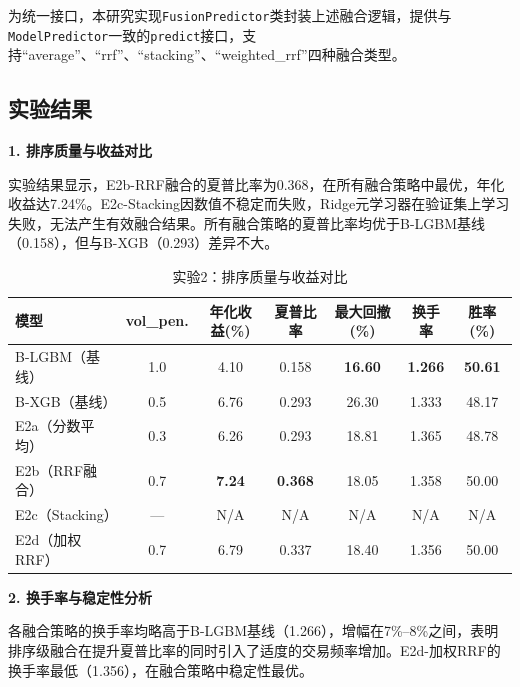 \documentclass[11pt,a4paper]{ctexart}
\newcommand{\best}[1]{\textcolor{bestval}{\textbf{#1}}}
\begin{document}
为统一接口，本研究实现\texttt{FusionPredictor}类封装上述融合逻辑，提供与\texttt{ModelPredictor}一致的\texttt{predict}接口，支持``average''、``rrf''、``stacking''、``weighted\_rrf''四种融合类型。

\subsection{实验结果}


\textbf{1. 排序质量与收益对比}

实验结果显示，E2b-RRF融合的夏普比率为0.368，在所有融合策略中最优，年化收益达7.24\%。E2c-Stacking因数值不稳定而失败，Ridge元学习器在验证集上学习失败，无法产生有效融合结果。所有融合策略的夏普比率均优于B-LGBM基线（0.158），但与B-XGB（0.293）差异不大。

\begin{table}[htbp]
\centering
\caption{实验2：排序质量与收益对比}
\label{tab:exp2-main}
\begin{tabular}{lcccccc}
\toprule
\textbf{模型} & \textbf{vol\_pen.} & \textbf{年化收益(\%)} & \textbf{夏普比率} & \textbf{最大回撤(\%)} & \textbf{换手率} & \textbf{胜率(\%)} \\
\midrule
B-LGBM（基线） & 1.0 & 4.10 & 0.158 & \best{16.60} & \best{1.266} & \best{50.61} \\
B-XGB（基线）  & 0.5 & 6.76 & 0.293 & 26.30 & 1.333 & 48.17 \\
E2a（分数平均） & 0.3 & 6.26 & 0.293 & 18.81 & 1.365 & 48.78 \\
E2b（RRF融合） & 0.7 & \best{7.24} & \best{0.368} & 18.05 & 1.358 & 50.00 \\
E2c（Stacking） & --- & N/A & N/A & N/A & N/A & N/A \\
E2d（加权RRF） & 0.7 & 6.79 & 0.337 & 18.40 & 1.356 & 50.00 \\
\bottomrule
\end{tabular}
\end{table}

\textbf{2. 换手率与稳定性分析}

各融合策略的换手率均略高于B-LGBM基线（1.266），增幅在7\%--8\%之间，表明排序级融合在提升夏普比率的同时引入了适度的交易频率增加。E2d-加权RRF的换手率最低（1.356），在融合策略中稳定性最优。
\end{document}
